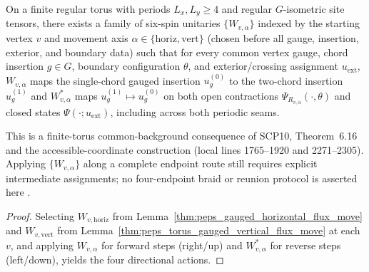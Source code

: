 \begin{lemma}
    \label{thm:peps_gauged_route_step}
    \leanok
    On a finite regular torus with periods $L_x,L_y\ge 4$ and regular $G$-isometric site tensors, there exists a family of six-spin unitaries $\{W_{v,\alpha}\}$ indexed by the starting vertex $v$ and movement axis $\alpha\in\{\mathrm{horiz},\mathrm{vert}\}$ (chosen before all gauge, insertion, exterior, and boundary data) such that for every common vertex gauge, chord insertion $g\in G$, boundary configuration $\theta$, and exterior/crossing assignment $u_{\mathrm{ext}}$, $W_{v,\alpha}$ maps the single-chord gauged insertion $u^{(0)}_g$ to the two-chord insertion $u^{(1)}_g$ and $W_{v,\alpha}^*$ maps $u^{(1)}_g\mapsto u^{(0)}_g$ on both open contractions $\Psi_{R_{v,\alpha}}(\cdot,\theta)$ and closed states $\Psi(\cdot;u_{\mathrm{ext}})$, including across both periodic seams.

    This is a finite-torus common-background consequence of SCP10,
    Theorem~6.16 and the accessible-coordinate construction (local lines
    1765--1920 and 2271--2305). Applying $\{W_{v,\alpha}\}$ along a complete endpoint route
    still requires explicit intermediate assignments; no
    four-endpoint braid or reunion protocol is asserted here
    \cite{gap:rmp_peps_quantum_double_g_isometry}.
\end{lemma}
\begin{proof}\leanok
    Selecting $W_{v,\mathrm{horiz}}$ from Lemma~\ref{thm:peps_gauged_horizontal_flux_move} and $W_{v,\mathrm{vert}}$ from Lemma~\ref{thm:peps_torus_gauged_vertical_flux_move} at each $v$, and applying $W_{v,\alpha}$ for forward steps (right/up) and $W_{v,\alpha}^*$ for reverse steps (left/down), yields the four directional actions.
\end{proof}
